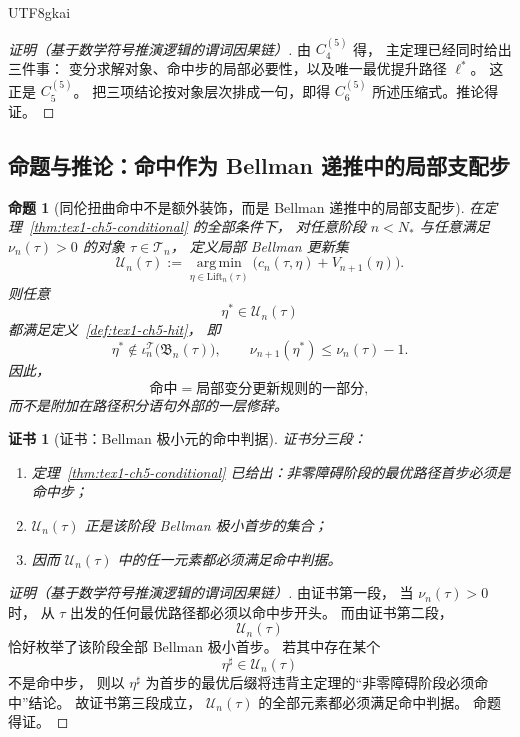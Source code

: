 \documentclass[12pt]{article}
\newtheorem{proposition}{命题}[section]
\newtheorem{Certificate}{证书}[section]
\begin{document}
\begin{CJK*}{UTF8}{gkai}
\begin{proof}[证明（基于数学符号推演逻辑的谓词因果链）]
由 \(C^{(5)}_4\) 得，
主定理已经同时给出三件事：
变分求解对象、命中步的局部必要性，以及唯一最优提升路径 \(\ell^\ast\)。
这正是 \(C^{(5)}_5\)。
把三项结论按对象层次排成一句，即得 \(C^{(5)}_6\) 所述压缩式。推论得证。
\end{proof}

\subsection{命题与推论：命中作为 Bellman 递推中的局部支配步}
\label{subsec:tex1-ch5-proposition}

\begin{proposition}[同伦扭曲命中不是额外装饰，而是 Bellman 递推中的局部支配步]
\label{prop:tex1-ch5-hit}
在定理~\ref{thm:tex1-ch5-conditional} 的全部条件下，
对任意阶段 \(n<N_\ast\) 与任意满足 \(\nu_n(\tau)>0\) 的对象 \(\tau\in\mathcal T_n\)，
定义局部 Bellman 更新集
\[
  \mathcal U_n(\tau)
  :=
  \operatorname*{arg\,min}_{\eta\in\mathrm{Lift}_n(\tau)}
  \bigl(c_n(\tau,\eta)+V_{n+1}(\eta)\bigr).
\]
则任意
\[
  \eta^\ast\in \mathcal U_n(\tau)
\]
都满足定义~\ref{def:tex1-ch5-hit}，
即
\[
  \eta^\ast\notin \iota_n^{\mathcal T}\bigl(\mathfrak B_n(\tau)\bigr),
  \qquad
  \nu_{n+1}(\eta^\ast)\le \nu_n(\tau)-1.
\]
因此，
\[
  \text{命中}
  =
  \text{局部变分更新规则的一部分},
\]
而不是附加在路径积分语句外部的一层修辞。
\end{proposition}

\begin{Certificate}[证书：Bellman 极小元的命中判据]
\label{cert:tex1-ch5-hit}
证书分三段：
\begin{enumerate}
  \item 定理~\ref{thm:tex1-ch5-conditional} 已给出：非零障碍阶段的最优路径首步必须是命中步；
  \item \(\mathcal U_n(\tau)\) 正是该阶段 Bellman 极小首步的集合；
  \item 因而 \(\mathcal U_n(\tau)\) 中的任一元素都必须满足命中判据。
\end{enumerate}
\end{Certificate}

\begin{proof}[证明（基于数学符号推演逻辑的谓词因果链）]
由证书第一段，
当 \(\nu_n(\tau)>0\) 时，
从 \(\tau\) 出发的任何最优路径都必须以命中步开头。
而由证书第二段，
\[
  \mathcal U_n(\tau)
\]
恰好枚举了该阶段全部 Bellman 极小首步。
若其中存在某个
\[
  \eta^\sharp\in\mathcal U_n(\tau)
\]
不是命中步，
则以 \(\eta^\sharp\) 为首步的最优后缀将违背主定理的“非零障碍阶段必须命中”结论。
故证书第三段成立，
\(\mathcal U_n(\tau)\) 的全部元素都必须满足命中判据。
命题得证。
\end{proof}


\end{CJK*}
\end{document}
